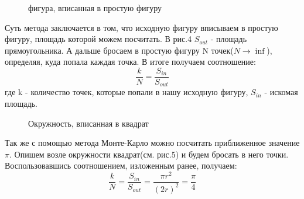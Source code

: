 \begin{figure}[h]
\caption{фигура, вписанная в простую фигуру}
\end{figure}

Суть метода заключается в том, что исходную фигуру вписываем в простую фигуру, площадь которой можем посчитать. В рис.4 $S_{out}$ - площадь прямоугольника. А дальше бросаем в простую фигуру N точек($N \rightarrow \inf$), определяя, куда попала каждая точка. В итоге получаем соотношение: 
$$
\frac{k}{N} = \frac{S_{in}}{S_{out}}
$$
где k - количество точек, которые попали в нашу исходную фигуру, $S_{in}$ - искомая площадь.

\begin{figure}[h]
\caption{Окружность, вписанная в квадрат}
\end{figure}
Так же с помощью метода Монте-Карло можно посчитать приближенное значение $\pi$. Опишем возле окружности квадрат(см. рис.5) и будем бросать в него точки. Воспользовавшись соотношением, изложенным ранее, получаем:   
$$
\frac{k}{N} = \frac{S_{in}}{S_{out}} = \frac{\pi r^2}{(2r)^2} = \frac{\pi}{4}
$$

